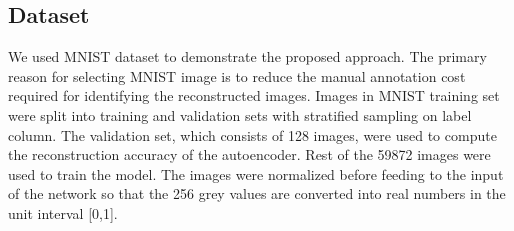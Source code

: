 \documentclass{uai2021} %
\begin{document}
\subsection{Dataset}
We used MNIST dataset\cite{lecun-mnisthandwrittendigit-2010} to demonstrate the proposed approach.
The primary reason for selecting MNIST image is to reduce the manual annotation cost required for identifying the reconstructed images.
Images in MNIST training set were split into training and validation sets with stratified sampling on label column.
The validation set, which consists of 128 images, were used to compute the reconstruction accuracy of the autoencoder.
Rest of the 59872 images were used to train the model.
The images were normalized  before feeding to the input of the network so that the 256 grey values are converted into real numbers in the unit interval [0,1].
\end{document}
